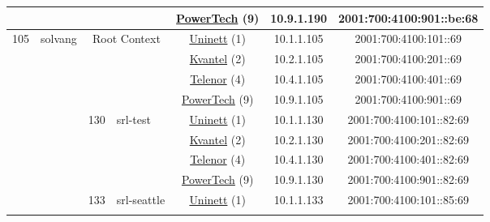 \begin{small}
\begin{center}
\begin{longtable}{|c|c|c|c|c|c|c|c|}
  &  &  &  & \multicolumn{2}{|c|}{\tiny{\href{http://www.powertech.no}{PowerTech} (9)}} & \tiny{10.9.1.190} & \tiny{2001:700:4100:901::be:68} \\ \hline
 \multirow{36}{*}{\tiny{105}} & \multicolumn{1}{|l|}{\multirow{36}{*}{\tiny{solvang}}} & \multicolumn{2}{|c|}{\multirow{4}{*}{\tiny{Root Context}}} & \multicolumn{2}{|c|}{\tiny{\href{https://www.uninett.no}{Uninett} (1)}} & \tiny{10.1.1.105} & \tiny{2001:700:4100:101::69} \\* \cline{5-5}\cline{6-6}\cline{7-7}\cline{8-8}
  &  & \multicolumn{2}{|c|}{} & \multicolumn{2}{|c|}{\tiny{\href{http://kvantel.no}{Kvantel} (2)}} & \tiny{10.2.1.105} & \tiny{2001:700:4100:201::69} \\* \cline{5-5}\cline{6-6}\cline{7-7}\cline{8-8}
  &  & \multicolumn{2}{|c|}{} & \multicolumn{2}{|c|}{\tiny{\href{https://www.telenor.no}{Telenor} (4)}} & \tiny{10.4.1.105} & \tiny{2001:700:4100:401::69} \\* \cline{5-5}\cline{6-6}\cline{7-7}\cline{8-8}
  &  & \multicolumn{2}{|c|}{} & \multicolumn{2}{|c|}{\tiny{\href{http://www.powertech.no}{PowerTech} (9)}} & \tiny{10.9.1.105} & \tiny{2001:700:4100:901::69} \\* \cline{3-3}\cline{4-4}\cline{5-5}\cline{6-6}\cline{7-7}\cline{8-8}
  &  & \multirow{4}{*}{\tiny{130}} & \multicolumn{1}{|l|}{\multirow{4}{*}{\tiny{srl-test}}} & \multicolumn{2}{|c|}{\tiny{\href{https://www.uninett.no}{Uninett} (1)}} & \tiny{10.1.1.130} & \tiny{2001:700:4100:101::82:69} \\* \cline{5-5}\cline{6-6}\cline{7-7}\cline{8-8}
  &  &  &  & \multicolumn{2}{|c|}{\tiny{\href{http://kvantel.no}{Kvantel} (2)}} & \tiny{10.2.1.130} & \tiny{2001:700:4100:201::82:69} \\* \cline{5-5}\cline{6-6}\cline{7-7}\cline{8-8}
  &  &  &  & \multicolumn{2}{|c|}{\tiny{\href{https://www.telenor.no}{Telenor} (4)}} & \tiny{10.4.1.130} & \tiny{2001:700:4100:401::82:69} \\* \cline{5-5}\cline{6-6}\cline{7-7}\cline{8-8}
  &  &  &  & \multicolumn{2}{|c|}{\tiny{\href{http://www.powertech.no}{PowerTech} (9)}} & \tiny{10.9.1.130} & \tiny{2001:700:4100:901::82:69} \\* \cline{3-3}\cline{4-4}\cline{5-5}\cline{6-6}\cline{7-7}\cline{8-8}
  &  & \multirow{4}{*}{\tiny{133}} & \multicolumn{1}{|l|}{\multirow{4}{*}{\tiny{srl-seattle}}} & \multicolumn{2}{|c|}{\tiny{\href{https://www.uninett.no}{Uninett} (1)}} & \tiny{10.1.1.133} & \tiny{2001:700:4100:101::85:69} \\* \cline{5-5}\cline{6-6}\cline{7-7}\cline{8-8}

\end{longtable}
\end{center}
\end{small}

